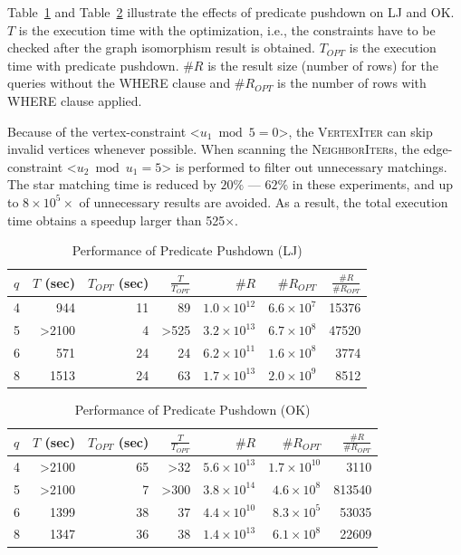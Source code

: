 Table~\ref{tab:pushdown_lj} and Table~\ref{tab:pushdown_ok} illustrate the effects of predicate pushdown on LJ and OK\@.
$T$ is the execution time with the optimization, i.e., the constraints have to be checked after the graph isomorphism result is obtained.
$T_{OPT}$ is the execution time with predicate pushdown.
$\#R$ is the result size (number of rows) for the queries without the WHERE clause and $\#R_{OPT}$ is the number of rows with WHERE clause applied.

Because of the vertex-constraint <$u_1 \bmod 5 = 0$>,
the \textsc{VertexIter} can skip invalid vertices whenever possible.
When scanning the \textsc{NeighborIter}s,
the edge-constraint <$u_2 \bmod u_1 = 5$> is performed to filter out unnecessary matchings.
The star matching time is reduced by $20\%$ --- $62\%$ in these experiments,
and up to $8 \times 10^5 \times$ of unnecessary results are avoided.
As a result, the total execution time obtains a speedup larger than 525$\times$.
\begin{table}
  \caption{Performance of Predicate Pushdown (LJ)}\label{tab:pushdown_lj}
  \begin{tabular}{lrrrrrr}
    \toprule
    $q$ & \parbox{5mm}{$T$ (sec)} & \parbox{5mm}{$T_{OPT}$ (sec)} & $\frac{T}{T_{OPT}}$ & $\#R$ & $\#R_{OPT}$ & $\frac{\#R}{\#R_{OPT}}$ \\
     &   944 &        11 &       89 &   $1.0 \times 10^{12}$ &   $6.6 \times 10^7$ &     15376 \\
    5 & >2100 &         4 &     >525 &  $3.2 \times 10^{13}$  &   $6.7 \times 10^8$ &     47520 \\
    6 &   571 &        24 &       24 &   $6.2 \times 10^{11}$ &   $1.6 \times 10^8$ &      3774 \\
    8 &  1513 &        24 &       63 &   $1.7 \times 10^{13}$ &    $2.0 \times 10^9$ &      8512 \\
    \bottomrule
  \end{tabular}
\end{table}

\begin{table}
  \caption{Performance of Predicate Pushdown (OK)}\label{tab:pushdown_ok}
  \begin{tabular}{lrrrrrr}
    \toprule
    $q$ & \parbox{5mm}{$T$ (sec)} & \parbox{5mm}{$T_{OPT}$ (sec)} & $\frac{T}{T_{OPT}}$ & $\#R$ & $\#R_{OPT}$ & $\frac{\#R}{\#R_{OPT}}$ \\
     & >2100 &        65 &      >32 &  $5.6 \times 10^{13}$ &   $1.7 \times 10^{10}$ &      3110 \\
    5 & >2100 &         7 &     >300 &  $3.8 \times 10^{14}$ &     $4.6 \times 10^8$ &     813540 \\
    6 &  1399 &        38 &       37 &  $4.4 \times 10^{10}$ &     $8.3 \times 10^5$ &      53035 \\
    8 &  1347 &        36 &       38 &  $1.4 \times 10^{13}$ &     $6.1 \times 10^8$ &      22609 \\
    \bottomrule
  \end{tabular}
\end{table}
